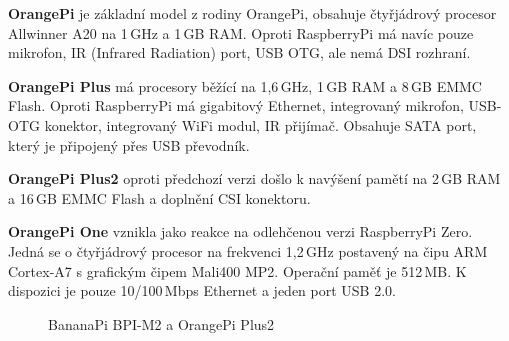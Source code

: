 		\textbf{OrangePi} je základní model z rodiny OrangePi, obsahuje čtyřjádrový procesor Allwinner A20 na 1\,GHz a 1\,GB RAM. Oproti RaspberryPi má navíc pouze mikrofon, IR (Infrared Radiation) port, USB OTG, ale nemá DSI rozhraní.
		
		\textbf{OrangePi Plus } má procesory běžící na 1,6\,GHz, 1\,GB RAM a 8\,GB EMMC Flash. Oproti RaspberryPi má gigabitový Ethernet, integrovaný mikrofon, USB-OTG konektor, integrovaný WiFi modul, IR přijímač. Obsahuje SATA port, který je připojený přes USB převodník.
		
		\textbf{OrangePi Plus2} oproti předchozí verzi došlo k navýšení pamětí na 2\,GB RAM a 16\,GB EMMC Flash a doplnění CSI konektoru.
		
		\textbf{OrangePi One} vznikla jako reakce na odlehčenou verzi RaspberryPi Zero. Jedná se o čtyřjádrový procesor na frekvenci 1,2\,GHz postavený na čipu ARM Cortex-A7 s grafickým čipem Mali400 MP2. Operační paměť je 512\,MB. K dispozici je pouze 10/100\,Mbps Ethernet a jeden port USB 2.0.

	\begin{figure}[!ht]
	\vspace{-10pt}
    \centering
			\hspace*{5mm}
			\caption{BananaPi BPI-M2 a OrangePi Plus2}
			\vspace{-10pt}	
\end{figure}
	
	

